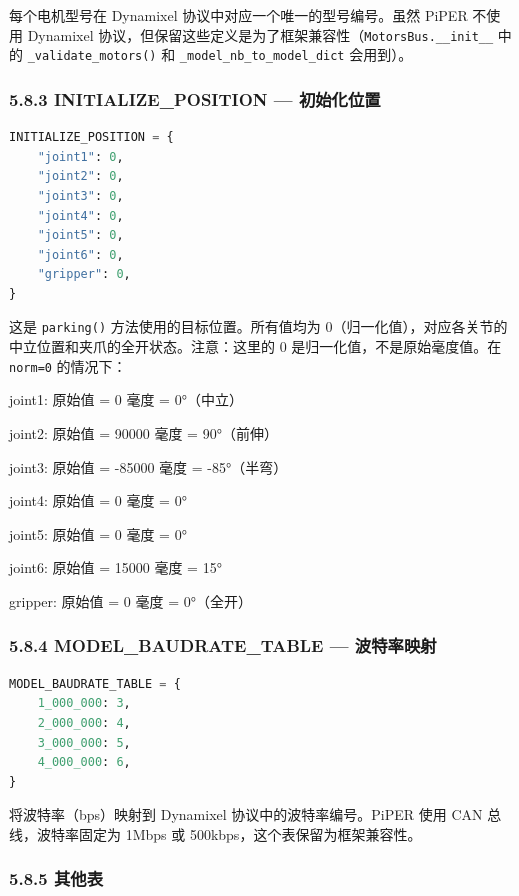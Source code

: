 \documentclass[UTF8,a4paper,11pt]{ctexart}
\begin{document}
{每个电机型号在 Dynamixel 协议中对应一个唯一的型号编号。虽然 PiPER 不使用 Dynamixel 协议，但保留这些定义是为了框架兼容性（\texttt{MotorsBus.__init__} 中的 \texttt{_validate_motors()} 和 \texttt{_model_nb_to_model_dict} 会用到）。

\subsubsection{5.8.3 INITIALIZE_POSITION — 初始化位置}

\begin{lstlisting}[language=python]
INITIALIZE_POSITION = {
    "joint1": 0,
    "joint2": 0,
    "joint3": 0,
    "joint4": 0,
    "joint5": 0,
    "joint6": 0,
    "gripper": 0,
}
\end{lstlisting}

这是 \texttt{parking()} 方法使用的目标位置。所有值均为 0（归一化值），对应各关节的中立位置和夹爪的全开状态。注意：这里的 0 是归一化值，不是原始毫度值。在 \texttt{norm=0} 的情况下：

\item joint1: 原始值 = 0 毫度 = 0°（中立）
\item joint2: 原始值 = 90000 毫度 = 90°（前伸）
\item joint3: 原始值 = -85000 毫度 = -85°（半弯）
\item joint4: 原始值 = 0 毫度 = 0°
\item joint5: 原始值 = 0 毫度 = 0°
\item joint6: 原始值 = 15000 毫度 = 15°
\item gripper: 原始值 = 0 毫度 = 0°（全开）

\subsubsection{5.8.4 MODEL_BAUDRATE_TABLE — 波特率映射}

\begin{lstlisting}[language=python]
MODEL_BAUDRATE_TABLE = {
    1_000_000: 3,
    2_000_000: 4,
    3_000_000: 5,
    4_000_000: 6,
}
\end{lstlisting}

将波特率（bps）映射到 Dynamixel 协议中的波特率编号。PiPER 使用 CAN 总线，波特率固定为 1Mbps 或 500kbps，这个表保留为框架兼容性。

\subsubsection{5.8.5 其他表}

}
\end{document}
